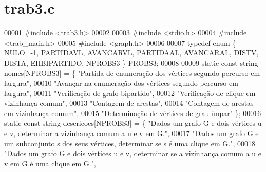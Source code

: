 \section{trab3.\+c}
\label{trab3_8c_source}

\begin{DoxyCode}
00001 \textcolor{preprocessor}{#include <trab3.h>}
00002 
00003 \textcolor{preprocessor}{#include <stdio.h>}
00004 \textcolor{preprocessor}{#include <trab_main.h>}
00005 \textcolor{preprocessor}{#include <graph.h>}
00006 
00007 \textcolor{keyword}{typedef} \textcolor{keyword}{enum} \{ NULO=-1, PARTIDAVL, AVANCARVL, PARTIDAAL, AVANCARAL, DISTV, DISTA, EHBIPARTIDO, NPROBS3 \} 
      PROBS3;
00008 
00009 \textcolor{keyword}{static} \textcolor{keyword}{const} \textcolor{keywordtype}{string} nomes[NPROBS3] = \{  \textcolor{stringliteral}{"Partida de enumeração dos vértices segundo percurso em largura"},
00010                                                                                 \textcolor{stringliteral}{"Avançar na enumeração dos
       vértices segundo percurso em largura"},
00011                                                                                 \textcolor{stringliteral}{"Verificação de grafo
       bipartido"},
00012                                                                                 \textcolor{stringliteral}{"Verificação de clique em
       vizinhança comum"},
00013                                                                                 \textcolor{stringliteral}{"Contagem de arestas"},
00014                                                                                 \textcolor{stringliteral}{"Contagem de arestas em
       vizinhança comum"},
00015                                                                                 \textcolor{stringliteral}{"Determinação de vértices
       de grau ímpar"} \};
00016 \textcolor{keyword}{static} \textcolor{keyword}{const} \textcolor{keywordtype}{string} descricoes[NPROBS3] = \{ \textcolor{stringliteral}{"Dados um grafo G e dois vértices u e v, determinar a
       vizinhança comum a u e v em G."},
00017                                                                                         \textcolor{stringliteral}{"Dados um grafo G e
       um subconjunto s dos seus vértices, determinar se s é uma clique em G."},
00018                                                                                         \textcolor{stringliteral}{"Dados um grafo G e
       dois vértices u e v, determinar se a vizinhança comum a u e v em G é uma clique em G."},

\end{DoxyCode}
